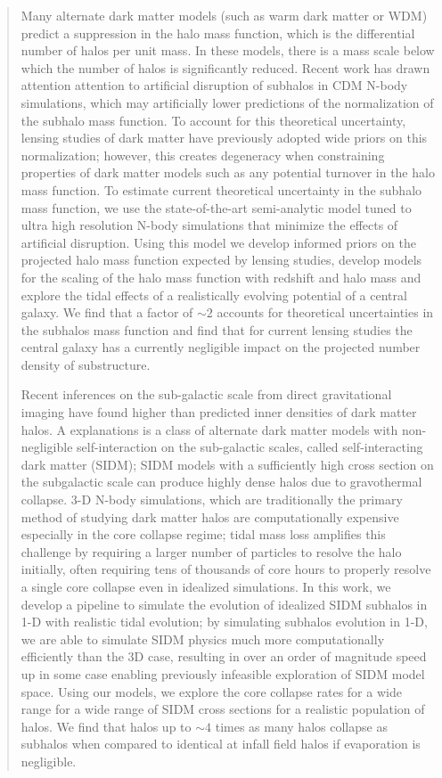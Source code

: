\begin{abstract}
 Many alternate dark matter models (such as warm dark matter or WDM) predict a suppression in the halo mass function, which is the differential number of halos per unit mass. In these models, there is a mass scale below which the number of halos is significantly reduced.
 Recent work has drawn attention attention to artificial disruption of subhalos in CDM N-body simulations, which may artificially lower predictions of the normalization of the subhalo mass function.  
 To account for this theoretical uncertainty, lensing studies of dark matter have previously adopted wide priors on this normalization; however, this creates degeneracy when constraining properties of dark matter models such as any potential turnover in the halo mass function. 
 To estimate current theoretical uncertainty in the subhalo mass function, we use the state-of-the-art semi-analytic \gal model tuned to ultra high resolution N-body simulations that minimize the effects of artificial disruption.
 Using this model we develop informed priors on the projected halo mass function expected by lensing studies, develop models for the scaling of the halo mass function with redshift and halo mass and explore the tidal effects of a realistically evolving potential of a central galaxy. 
 We find that a factor of $\sim 2$ accounts for theoretical uncertainties in the subhalos mass function and find that for current lensing studies the central galaxy has a currently negligible impact on the projected number density of substructure.  
 
 Recent inferences on the sub-galactic scale from direct gravitational imaging have found higher than predicted inner densities of dark matter halos. 
 A explanations is a class of alternate dark matter models with non-negligible self-interaction on the sub-galactic scales, called self-interacting dark matter (SIDM); SIDM models with a sufficiently high cross section on the subgalactic scale can produce highly dense halos due to gravothermal collapse. 
 3-D N-body simulations, which are traditionally the primary method of studying dark matter halos are computationally expensive especially in the core collapse regime; tidal mass loss amplifies this challenge by requiring a larger number of particles to resolve the halo initially, often requiring tens of thousands of core hours to properly resolve a single core collapse even in idealized simulations. 
 In this work, we develop a pipeline to simulate the evolution of idealized SIDM subhalos in 1-D with realistic tidal evolution; by simulating subhalos evolution in 1-D, we are able to simulate SIDM physics much more computationally efficiently than the 3D case, resulting in over an order of magnitude speed up in some case enabling previously infeasible exploration of SIDM model space. 
 Using our models, we explore the core collapse rates for a wide range for a wide range of SIDM cross sections for a realistic population of halos. 
 We find that halos up to $\sim 4$ times as many halos collapse as subhalos when compared to identical at infall field halos if evaporation is negligible.  
 
\end{abstract}
